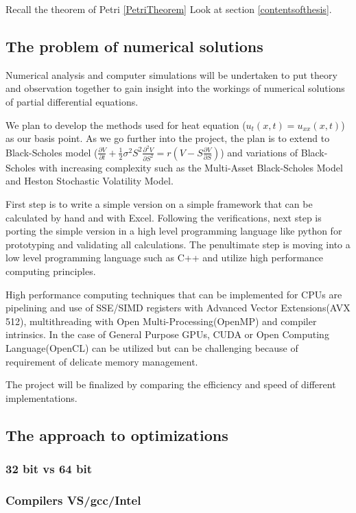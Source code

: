 \documentclass[12pt, oneside]{book}
\theoremstyle{plain}
\theoremstyle{definition}
\begin{document}
Recall the theorem of Petri \ref{PetriTheorem}
Look at section \ref{contentsofthesis}.

\subsection{The problem of numerical solutions}
Numerical analysis and computer simulations will be undertaken to put theory and observation together to gain insight into the workings of numerical solutions of partial differential equations.

We plan to develop the methods used for heat equation (${u_t(x,t)=u_{xx}(x,t)}$) as our basis point. As we go further into the project, the plan is to extend to Black-Scholes model ($\frac{\partial V}{\partial t} + \frac{1}{2}\sigma^2 S^2 \frac{\partial^2 V}{\partial S^2} = r(V - S \frac{\partial V}{\partial S})$)  and variations of Black-Scholes with increasing complexity such as the Multi-Asset Black-Scholes Model and Heston Stochastic Volatility Model.

First step is to write a simple version on a simple framework that can be calculated by hand and with Excel. Following the verifications, next step is porting the simple version in a high level programming language like python for prototyping and validating all calculations. The penultimate step is moving into a low level programming language such as C++ and utilize high performance computing principles.

High performance computing techniques that can be implemented for CPUs are pipelining and use of SSE/SIMD\cite{kusswurm} registers with Advanced Vector Extensions(AVX 512), multithreading with Open Multi-Processing(OpenMP) and compiler intrinsics. In the case of General Purpose GPUs, CUDA or Open Computing Language(OpenCL) can be utilized but can be challenging because of requirement of delicate memory management.

The project will be finalized by comparing the efficiency and speed of different implementations.


\subsection{The approach to optimizations}
\subsubsection{32 bit vs 64 bit}
\lipsum[5]
\subsubsection{Compilers VS/gcc/Intel}
\lipsum[5]
\end{document}
